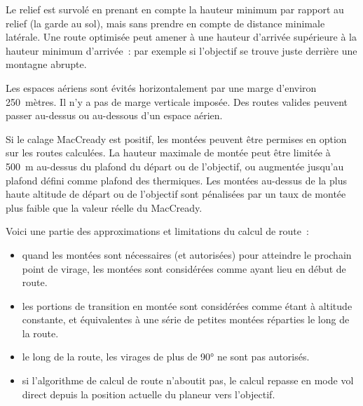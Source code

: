 Le relief est survolé en prenant en compte la hauteur minimum par rapport au relief (la garde au sol),
mais sans prendre en compte de distance minimale latérale.
Une route optimisée peut amener à une hauteur d'arrivée supérieure à la hauteur minimum d'arrivée~: par exemple si l'objectif se trouve juste derrière une montagne abrupte.

Les espaces aériens sont évités horizontalement par une marge d'environ 250~mètres. Il n'y a pas de marge verticale imposée. Des routes valides peuvent passer au-dessus ou au-dessous d'un espace aérien.

Si le calage MacCready est positif, les montées peuvent être permises en option
sur les routes calculées. La hauteur maximale de montée
peut être limitée à 500~m au-dessus du plafond du départ ou de l'objectif,
ou augmentée jusqu'au plafond défini comme plafond des thermiques.
 Les montées au-dessus de la plus haute altitude de départ ou de l'objectif sont pénalisées par un taux de montée plus faible que la
valeur réelle du MacCready.

Voici une partie des approximations et limitations du calcul de route~:
\begin{itemize}
\item quand les montées sont nécessaires (et autorisées) pour atteindre le prochain point de virage, les montées sont considérées comme ayant lieu en début de route.
\item les portions de transition en montée sont considérées comme étant à altitude constante, et équivalentes à une série de petites montées réparties le long de la route.
\item le long de la route, les virages de plus de 90° ne sont pas autorisés.
\item si l'algorithme de calcul de route n'aboutit pas, le calcul repasse en mode vol direct depuis la position actuelle du planeur vers l'objectif.
\end{itemize}
